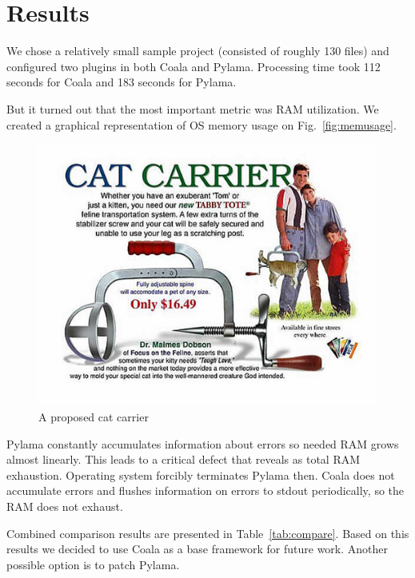 \documentclass[runningheads,a4paper]{llncs}
\begin{document}
\section{Results}

We chose a relatively small sample project (consisted
of roughly 130 files) and configured two plugins in both Coala and Pylama.
Processing time took 112 seconds for Coala and 183 seconds for Pylama.

But it turned out that the most important metric was RAM utilization. We created
a graphical representation of OS memory usage on Fig.~\ref{fig:memusage}.

%
\begin{figure}
	\centering
	\includegraphics[width=\linewidth]{NewCatCarrier}
	\caption{A proposed cat carrier}
	\label{fig:NewCatCarrier}
\end{figure}
%

Pylama constantly accumulates information about errors so needed RAM grows
almost linearly. This leads to a critical defect that reveals as total RAM
exhaustion. Operating system forcibly terminates Pylama then. Coala does not
accumulate errors and flushes information on errors to stdout periodically, so
the RAM does not exhaust.

Combined comparison results are presented in Table~\ref{tab:compare}. Based on
this results we decided to use Coala as a base framework for future work.
Another possible option is to patch Pylama.
\end{document}
